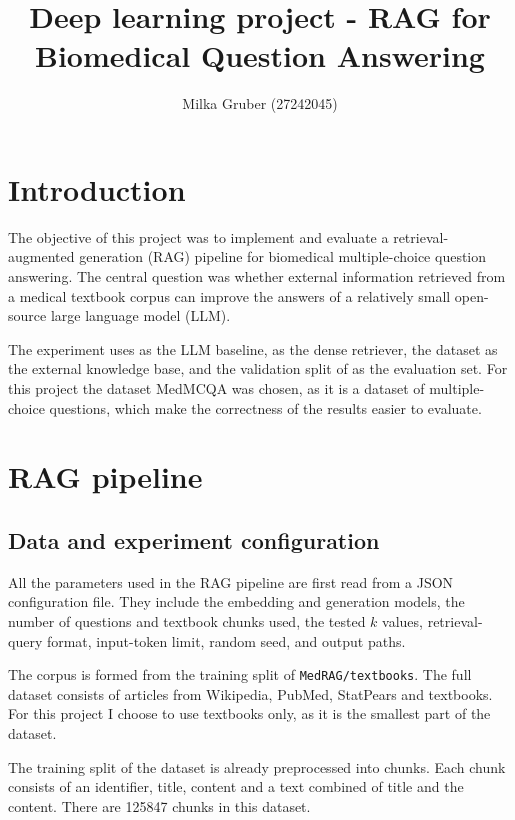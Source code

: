\documentclass{article}
\title{Deep learning project - RAG for Biomedical Question Answering}
\author{
Milka Gruber (27242045)
}
\begin{document}
\maketitle

\section{Introduction}
The objective of this project was to implement and evaluate a retrieval-augmented
generation (RAG) pipeline for biomedical multiple-choice question answering. The
central question was whether external information retrieved from a medical textbook corpus can
improve the answers of a relatively small open-source large language model (LLM).

The experiment uses  as the LLM baseline,
 as the dense retriever, the
 dataset as the external knowledge base, and the validation split
of  as the evaluation set. For this project
the dataset MedMCQA was chosen, as it is a dataset of multiple-choice questions,
which make the correctness of the results easier to evaluate. 


\section{RAG pipeline}

\subsection{Data and experiment configuration}

All the parameters used in the RAG pipeline are first read from a JSON configuration file.
They include the embedding and generation models, the number of questions and
textbook chunks used, the tested $k$ values, retrieval-query format, input-token limit,
random seed, and output paths. 

The corpus is formed from the training split of \texttt{MedRAG/textbooks}.
The full dataset consists of articles from Wikipedia, PubMed, StatPears and textbooks.
For this project I choose to use textbooks only, as it is the smallest part of the dataset.

The training split of the dataset is already preprocessed into chunks. 
Each chunk consists of an identifier, title, content and a text combined of title and the content. 
There are 125847 chunks in this dataset. 
\end{document}
